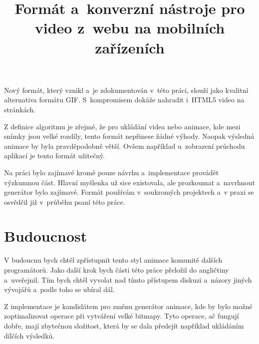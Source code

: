 \documentclass[thesis=B,czech]{FITthesis}[2012/06/26]
\title{Formát a~konverzní nástroje pro video z~webu na mobilních zařízeních}
\begin{document}












\begin{conclusion}

Nový formát, který vznikl a~je zdokumentován v~této práci, slouží jako kvalitní alternativa formátu GIF. S~kompromisem dokáže nahradit i~HTML5 video na stránkách. 

Z definice algoritmu je zřejmé, že pro ukládání videa nebo animace, kde mezi snímky jsou velké rozdíly, tento formát nepřinese žádné výhody. Naopak výsledná animace by byla pravděpodobně větší. Ovšem například u~zobrazení průchodu aplikací je tento formát užitečný. 

Na práci bylo zajímavé kromě pouze návrhu a~implementace provádět výzkumnou část. Hlavní myšlenka už sice existovala, ale prozkoumat a~navrhnout generátor bylo zajímavé. Formát používám v~soukromých projektech a~v praxi se osvědčil již v~průběhu psaní této práce.


\section{Budoucnost}

V budoucnu bych chtěl zpřístupnit tento styl animace komunitě dalších programátorů. Jako další krok bych části této práce přeložil do angličtiny a~uveřejnil. Tím bych chtěl vyvolat nad tímto přístupem diskuzi a~názory jiných vývojářů a~podle toho se ubíral dál.

Z implementace je kandidátem pro změnu generátor animace, kde by bylo možné zoptimalizovat operace při vytváření velké bitmapy. Tyto operace, ač fungují dobře, mají zbytečnou složitost, která by se dala předejít například ukládáním dílčích výsledků. 


\end{conclusion}




\appendix
\end{document}
